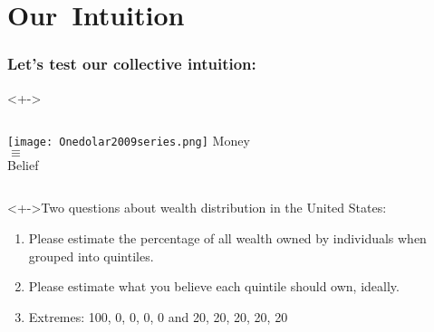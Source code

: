 









\section{Our\ Intuition}

\begin{frame}
  \frametitle{Let's test our collective intuition:}

  \begin{block}<+->{}
    \begin{columns}[t]
      \texttt{[image: Onedolar2009series.png]}
      \centering
      Money \\
      $\equiv$ \\
      Belief
    \end{columns}
  \end{block}

  \begin{block}<+->{Two questions about wealth distribution in the United States:}
    \begin{enumerate}
    \item<+->
      Please estimate the percentage of all wealth 
      owned by individuals when grouped into quintiles.
    \item<+->
      Please estimate what you believe each quintile
      should own, ideally.
    \item<+->
      Extremes: 100, 0, 0, 0, 0 and 20, 20, 20, 20, 20
    \end{enumerate}
  \end{block}
  
\end{frame}

